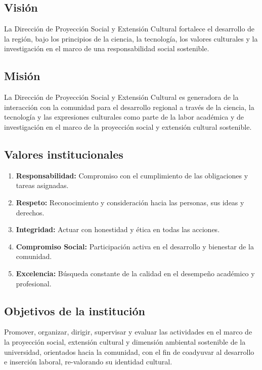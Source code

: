 \subsection{Visión}	
La Dirección de Proyección Social y Extensión Cultural fortalece el desarrollo de la región, bajo los principios de la ciencia, la tecnología, los valores culturales y la investigación en el marco de una responsabilidad social sostenible.

\subsection{Misión}
La Dirección de Proyección Social y Extensión Cultural es generadora de la interacción con la comunidad para el desarrollo regional a través de la ciencia, la tecnología y las expresiones culturales como parte de la labor académica y de investigación en el marco de la proyección social y extensión cultural sostenible.

\subsection{Valores institucionales}
\begin{enumerate}
    \item \textbf{Responsabilidad:} Compromiso con el cumplimiento de las obligaciones y tareas asignadas.
    \item \textbf{Respeto:} Reconocimiento y consideración hacia las personas, sus ideas y derechos.
    \item \textbf{Integridad:} Actuar con honestidad y ética en todas las acciones.
    \item \textbf{Compromiso Social:} Participación activa en el desarrollo y bienestar de la comunidad.
    \item \textbf{Excelencia:} Búsqueda constante de la calidad en el desempeño académico y profesional.
    
\end{enumerate}

\subsection{Objetivos de la institución}
Promover, organizar, dirigir, supervisar y evaluar las actividades en el marco de la proyección social, extensión cultural y dimensión ambiental sostenible de la universidad, orientados hacia la comunidad, con el fin de coadyuvar al desarrollo e inserción laboral, re-valorando su identidad cultural.

